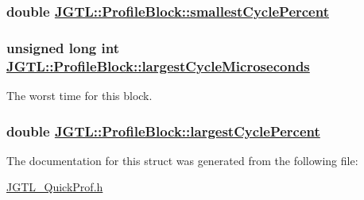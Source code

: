 \hypertarget{struct_j_g_t_l_1_1_profile_block_75a7c8c6d211c681097adf60c797c56e}{
\subsubsection[smallestCyclePercent]{\setlength{\rightskip}{0pt plus 5cm}double \hyperlink{struct_j_g_t_l_1_1_profile_block_75a7c8c6d211c681097adf60c797c56e}{JGTL::Profile\-Block::smallest\-Cycle\-Percent}}}
\label{struct_j_g_t_l_1_1_profile_block_75a7c8c6d211c681097adf60c797c56e}


\hypertarget{struct_j_g_t_l_1_1_profile_block_6dc09e684472a23ea795a39d3c113977}{
\subsubsection[largestCycleMicroseconds]{\setlength{\rightskip}{0pt plus 5cm}unsigned long int \hyperlink{struct_j_g_t_l_1_1_profile_block_6dc09e684472a23ea795a39d3c113977}{JGTL::Profile\-Block::largest\-Cycle\-Microseconds}}}
\label{struct_j_g_t_l_1_1_profile_block_6dc09e684472a23ea795a39d3c113977}


The worst time for this block. 

\hypertarget{struct_j_g_t_l_1_1_profile_block_15d4a484adfda90c368bbacdf680d99c}{
\subsubsection[largestCyclePercent]{\setlength{\rightskip}{0pt plus 5cm}double \hyperlink{struct_j_g_t_l_1_1_profile_block_15d4a484adfda90c368bbacdf680d99c}{JGTL::Profile\-Block::largest\-Cycle\-Percent}}}
\label{struct_j_g_t_l_1_1_profile_block_15d4a484adfda90c368bbacdf680d99c}




The documentation for this struct was generated from the following file:\begin{CompactItemize}
\item 
\hyperlink{_j_g_t_l___quick_prof_8h}{JGTL\_\-Quick\-Prof.h}\end{CompactItemize}
